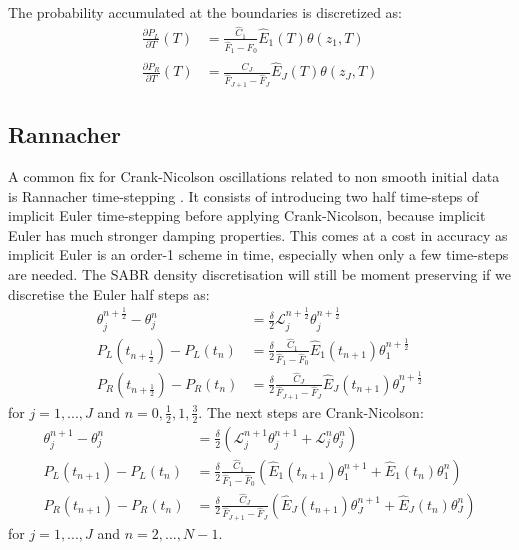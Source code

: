 \documentclass[]{rAMF2e}
\begin{document}
The probability accumulated at the boundaries is discretized as:
\begin{align}
\frac{\partial P_L}{\partial T} (T) &= \frac{\hat{C}_1}{\hat{F}_1-\hat{F}_0}\hat{E}_1(T)\theta(z_1, T) \\
\frac{\partial P_R}{\partial T} (T) &= \frac{\hat{C}_J}{\hat{F}_{J+1}-\hat{F}_J}\hat{E}_J(T)\theta(z_J, T) 
\end{align}



\subsection{Rannacher}
A common fix for Crank-Nicolson oscillations related to non smooth initial data is Rannacher time-stepping \citep{rannacher1984finite, GiCa2006}. It consists of introducing two half time-steps of implicit Euler time-stepping before applying Crank-Nicolson, because implicit Euler has much stronger damping properties. This comes at a cost in accuracy as implicit Euler is an order-1 scheme in time, especially when only a few time-steps are needed. 
The SABR density discretisation will still be moment preserving if we discretise the Euler half steps as:
\begin{subequations}\label{eqn_euler_1}
\begin{align}
\theta_j^{n+\frac{1}{2}}-\theta_j^n &= \frac{\delta}{2} \mathcal{L}_{j}^{n+\frac{1}{2}} \theta_j^{n+\frac{1}{2}} \\
P_L (t_{n+\frac{1}{2}}) - P_L (t_{n}) &=   \frac{\delta}{2} \frac{\hat{C}_1}{\hat{F}_1-\hat{F}_0}\hat{E}_1(t_{n+1})\theta_1^{n+\frac{1}{2}} \\
P_R (t_{n+\frac{1}{2}}) -  P_R (t_{n}) &=\frac{\delta}{2} \frac{\hat{C}_J}{\hat{F}_{J+1}-\hat{F}_J}\hat{E}_J(t_{n+1})\theta_J^{n+\frac{1}{2}}
\end{align}
\end{subequations}
for $j=1,...,J$ and $n = 0, \frac{1}{2}, 1, \frac{3}{2}$. The next steps are Crank-Nicolson:
\begin{subequations}
\begin{align}\label{eqn_cn_1}
\theta_j^{n+1}-\theta_j^n &= \frac{\delta}{2} \left( \mathcal{L}_{j}^{n+1}\theta_j^{n+1} + \mathcal{L}_{j}^{n}\theta_j^{n} \right) \\
P_L (t_{n+1})- P_L (t_{n}) &= \frac{\delta}{2} \frac{\hat{C}_1}{\hat{F}_1-\hat{F}_0}\left(\hat{E}_1(t_{n+1})\theta_1^{n+1}+\hat{E}_1(t_{n})\theta_1^{n} \right)\\
P_R (t_{n+1})-P_R (t_{n}) &=  \frac{\delta}{2} \frac{\hat{C}_J}{\hat{F}_{J+1}-\hat{F}_J}\left(\hat{E}_J(t_{n+1})\theta_J^{n+1}+\hat{E}_J(t_{n})\theta_J^{n} \right)
\end{align}
\end{subequations}
for $j=1,...,J$ and $n=2,...,N-1$.
\end{document}
